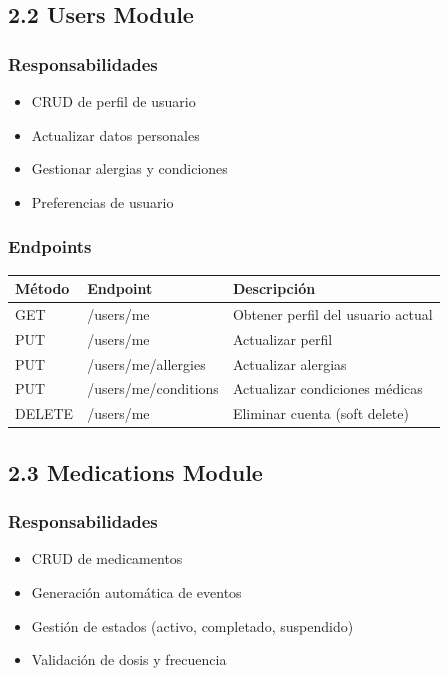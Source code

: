 \documentclass[12pt,a4paper]{article}
\begin{document}
\subsection{2.2 Users Module}

\subsubsection{Responsabilidades}
\begin{itemize}
    \item CRUD de perfil de usuario
    \item Actualizar datos personales
    \item Gestionar alergias y condiciones
    \item Preferencias de usuario
\end{itemize}

\subsubsection{Endpoints}

\begin{center}
\begin{tabular}{|l|l|l|}
\hline
\rowcolor{lightblue}
\textbf{Método} & \textbf{Endpoint} & \textbf{Descripción} \\
\hline
GET & /users/me & Obtener perfil del usuario actual \\
\hline
PUT & /users/me & Actualizar perfil \\
\hline
PUT & /users/me/allergies & Actualizar alergias \\
\hline
PUT & /users/me/conditions & Actualizar condiciones médicas \\
\hline
DELETE & /users/me & Eliminar cuenta (soft delete) \\
\hline
\end{tabular}
\end{center}

\subsection{2.3 Medications Module}

\subsubsection{Responsabilidades}
\begin{itemize}
    \item CRUD de medicamentos
    \item Generación automática de eventos
    \item Gestión de estados (activo, completado, suspendido)
    \item Validación de dosis y frecuencia
\end{itemize}
\end{document}
